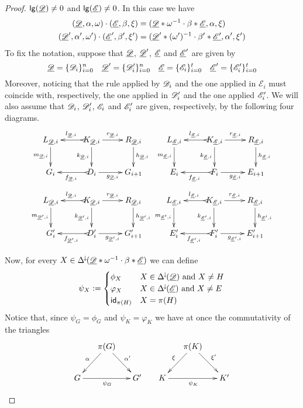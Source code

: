 \begin{proof}
		\smallskip \noindent $\mathsf{lg}(\underline{\mathscr{D}})\neq 0$ and $\mathsf{lg}(\underline{\mathscr{E}})\neq 0$. In this case we have
		\begin{align*}
			(\underline{\mathscr{D}}, \alpha, \omega)\cdot (\underline{\mathscr{E}}, \beta, \xi)&=(\underline{\mathscr{D}}*\omega^{-1}\cdot \beta*\underline{\mathscr{E}}, \alpha, \xi)\\
			(\underline{\mathscr{D}}', \alpha', \omega')\cdot (\underline{\mathscr{E}}', \beta', \xi')&=(\underline{\mathscr{D}}'*(\omega')^{-1}\cdot \beta'*\underline{\mathscr{E'}}, \alpha', \xi')
		\end{align*}
		To fix the notation, suppose that $\underline{\mathscr{D}}$, $\underline{\mathscr{D}}'$, $\underline{\mathscr{E}}$ and $\underline{\mathscr{E}}'$ are given by
		\[\underline{\mathscr{D}}=\{\mathscr{D}_i\}_{i=0}^n \quad \underline{\mathscr{D}}'=\{\mathscr{D}'_i\}_{i=0}^n \quad \underline{\mathscr{E}}=\{\mathscr{E}_i\}_{i=0}^t \quad \underline{\mathscr{E}}'=\{\mathscr{E}'_i\}_{i=0}^t\]
		Moreover, noticing that the rule applied by $\mathscr{D}_i$ and the one applied in $\mathcal{E}_i$  must coincide with, respectively, the one applied in $\mathscr{D}'_i$ and the one applied $\mathscr{E}'_i$. We will also assume that $\mathscr{D}_i$, $\mathscr{D}'_i$, $\mathscr{E}_i$ and $\mathscr{E}'_i$ are given, respectively, by the following four diagrams. 
		\[\xymatrix{L_{\der{D},i} \ar[d]_{m_{\der{D}, i}}& K_{\der{D},i} \ar[d]_{k_{\der{D}, i}} \ar[r]^{r_{\der{D},i}} \ar@{>->}[l]_{l_{\der{D},i}} & R_{\der{D},i}\ar[d]^{h_{\der{D}, i}} &L_{\der{E},i} \ar[d]_{m_{\der{E}, i}}& K_{\der{E},i} \ar[d]_{k_{\der{E}, i}} \ar[r]^{r_{\der{E},i}} \ar@{>->}[l]_{l_{\der{E},i}} & R_{\der{E},i}\ar[d]^{h_{\der{E}, i}} \\G_i & D_i \ar[r]_{g_{\der{D},i}} \ar@{>->}[l]^{f_{\der{D},i}} & G_{i+1} & E_i & F_i\ar[r]_{g_{\der{E},i}} \ar@{>->}[l]^{f_{\der{E},i}}  & E_{i+1}}\]
		\[\xymatrix{L_{\der{D},i} \ar[d]_{m_{\der{D}', i}}& K_{\der{D},i} \ar[d]_{k_{\der{D}', i}} \ar[r]^{r_{\der{D},i}} \ar@{>->}[l]_{l_{\der{D},i}} & R_{\der{D},i}\ar[d]^{h_{\der{D}', i}} &L_{\der{E},i} \ar[d]_{m_{\der{E}', i}}& K_{\der{E},i} \ar[d]_{k_{\der{E}', i}} \ar[r]^{r_{\der{E},i}} \ar@{>->}[l]_{l_{\der{E},i}} & R_{\der{E},i}\ar[d]^{h_{\der{E}', i}} \\G'_i & D'_i \ar[r]_{g_{\der{D}',i}} \ar@{>->}[l]^{f_{\der{D}',i}} & G'_{i+1} & E'_i & F'_i\ar[r]_{g_{\der{E}',i}} \ar@{>->}[l]^{f_{\der{E}',i}}  & E'_{i+1}}\]
		
		Now, for every $X\in \Delta^{\hspace{-1pt}\downarrow\hspace{-1pt}}(\underline{\mathscr{D}}*\omega^{-1}\cdot \beta*\underline{\mathscr{E}})$ we can define
		\[\psi_X:=\begin{cases}
			\phi_X & X\in  \Delta^{\hspace{-1pt}\downarrow\hspace{-1pt}}(\underline{\mathscr{D}})\text{ and } X\neq H\\\varphi_X & X\in  \Delta^{\hspace{-1pt}\downarrow\hspace{-1pt}}(\underline{\mathscr{E}}) \text{ and } X\neq E\\\mathsf{id}_{\pi(H)}& X=\pi(H)\end{cases}\]
		Notice that, since $\psi_G=\phi_G$ and $\psi_K=\varphi_K$ we have at once  the commutativity of the triangles
		\[\xymatrix@C=15pt{&\pi(G) \ar[dr]^{\alpha'} \ar[dl]_{\alpha}&&& \pi(K) \ar[dr]^{\xi'} \ar[dl]_{\xi}\\ G\ar[rr]_{\psi_G} && G' &K \ar[rr]_{\psi_K} && K' } \]
		

\end{proof}
